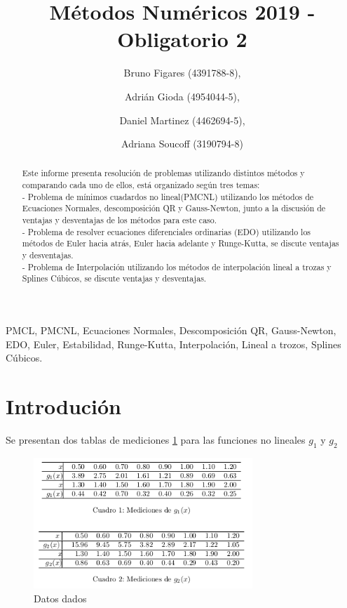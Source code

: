 \documentclass{endm}
\begin{document}
\begin{frontmatter}

\title{Métodos Numéricos 2019 - Obligatorio 2}

\author{Bruno Figares (4391788-8),}
\author{Adrián Gioda (4954044-5),}
\author{Daniel Martinez (4462694-5),}
\author{Adriana Soucoff (3190794-8)}

\address{Instituto de Matem\'atica y Estad\'istica\\ Facultad de Ingenier\'ia. Universidad de la Rep\'ublica\\ Montevideo, Uruguay}


\begin{abstract}
\setlength{\parindent}{12pt}
Este informe presenta resolución de problemas utilizando distintos métodos y comparando cada uno de ellos, está organizado según tres temas:\\
    - Problema de mínimos cuadardos no lineal(PMCNL) utilizando los métodos de Ecuaciones Normales, descomposición QR y Gauss-Newton, junto a la discusión de ventajas y desventajas de los métodos para este caso.\\
    - Problema de resolver ecuaciones diferenciales ordinarias (EDO) utilizando los métodos de Euler hacia atrás, Euler hacia adelante y Runge-Kutta, se discute ventajas y desventajas.\\
    - Problema de Interpolación utilizando los métodos de interpolación lineal a trozas y Splines Cúbicos, se discute ventajas y desventajas.
\end{abstract}

\begin{keyword}
PMCL, PMCNL, Ecuaciones Normales, Descomposición QR, Gauss-Newton, EDO, Euler, Estabilidad, Runge-Kutta, Interpolación, Lineal a trozos, Splines Cúbicos.
\end{keyword}
\end{frontmatter}
\clearpage
\section{Introdución}\label{intro}
Se presentan dos tablas de mediciones \ref{fig:datos} para las funciones no lineales $g_1$ y $g_2$ 
\begin{figure}
    \centering
    \includegraphics[width=8.25cm]{grillaini.png}
    \caption{Datos dados}
    \label{fig:datos}
\end{figure}
\end{document}
